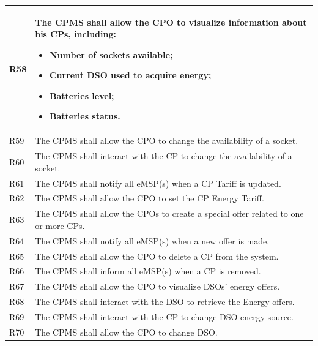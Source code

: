 \documentclass{Configuration_Files/PoliMi3i_thesis}
\begin{document}
\begin{xltabular}{\textwidth}{| >{}l | X |}
R58 &
    The CPMS shall allow the CPO to visualize information about his CPs, including:
    \begin{itemize}
        \item Number of sockets available;
        \item Current DSO used to acquire energy;
        \item Batteries level;
        \item Batteries status.
    \end{itemize}\B\\
\hline


R59 &
    The CPMS shall allow the CPO to change the availability of a socket.\B\\
\hline

R60 &
    The CPMS shall interact with the CP to change the availability of a socket.\B\\
\hline

R61 &
    The CPMS  shall notify all eMSP(s) when a CP Tariff is updated.\B\\
    \hline
R62 &
    The CPMS shall allow the CPO to set the CP Energy Tariff.\B\\
\hline
R63 &
    The CPMS shall allow the CPOs to create a special offer related to one or more CPs.\B\\
\hline

R64 &
    The CPMS  shall notify all eMSP(s) when a new offer is made.\B\\
\hline

R65 &
    The CPMS shall allow the CPO to delete a CP from the system.\B\\
\hline

R66 &
    The CPMS shall inform all eMSP(s) when a CP is removed.\B\\
\hline

R67 &
    The CPMS shall allow the CPO to visualize DSOs' energy offers.\B\\
\hline

R68 &
    The CPMS shall interact with the DSO to retrieve the Energy offers.\B\\
\hline

R69 &
    The CPMS shall interact with the CP to change DSO energy source.\B\\
\hline
    
R70 &
    The CPMS shall allow the CPO to change DSO.\B\\
\hline


\end{xltabular}
\end{document}
